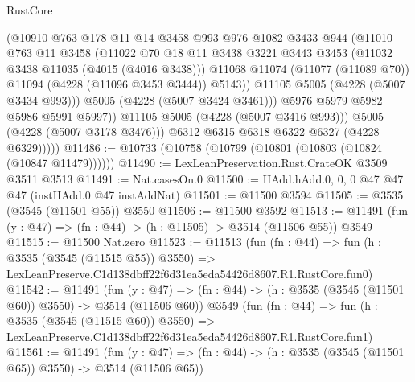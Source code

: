 \begin{lexlean}{RustCore}
\begin{coremodule}
                      (@10910
                        @763
                        @178
                        @11
                        @14
                        @3458
                        @993
                        @976
                        @1082
                        @3433
                        @944
                        (@11010
                          @763
                          @11
                          @3458
                          (@11022
                            @70
                            @18
                            @11
                            @3438
                            @3221
                            @3443
                            @3453
                            (@11032 @3438 @11035 (@4015 (@4016 @3438)))
                            @11068
                            @11074
                            (@11077 (@11089 @70))
                            @11094
                            (@4228 (@11096 @3453 @3444))
                            @5143))
                        @11105
                        @5005
                        (@4228 (@5007 @3434 @993)))
                      @5005
                      (@4228 (@5007 @3424 @3461)))
                    @5976
                    @5979
                    @5982
                    @5986
                    @5991
                    @5997))
                @11105
                @5005
                (@4228 (@5007 @3416 @993)))
              @5005
              (@4228 (@5007 @3178 @3476)))
            @6312
            @6315
            @6318
            @6322
            @6327
            (@4228 @6329)))))
@11486 := @10733 (@10758 (@10799 (@10801 (@10803 (@10824 (@10847 @11479))))))
@11490 := LexLeanPreservation.Rust.CrateOK @3509 @3511 @3513
@11491 := Nat.casesOn.{0}
@11500 := HAdd.hAdd.{0, 0, 0} @47 @47 @47 (instHAdd.{0} @47 instAddNat)
@11501 := @11500 @3594
@11505 := @3535 (@3545 (@11501 @55)) @3550
@11506 := @11500 @3592
@11513 := @11491 (fun (y : @47) => (fn : @44) -> (h : @11505) -> @3514 (@11506 @55)) @3549
@11515 := @11500 Nat.zero
@11523 := @11513
    (fun (fn : @44) =>
    fun (h : @3535 (@3545 (@11515 @55)) @3550) =>
    LexLeanPreserve.C1d138dbff22f6d31ea5eda54426d8607.R1.RustCore.fun0)
@11542 := @11491
    (fun (y : @47) => (fn : @44) -> (h : @3535 (@3545 (@11501 @60)) @3550) -> @3514 (@11506 @60))
    @3549
    (fun (fn : @44) =>
    fun (h : @3535 (@3545 (@11515 @60)) @3550) =>
    LexLeanPreserve.C1d138dbff22f6d31ea5eda54426d8607.R1.RustCore.fun1)
@11561 := @11491
    (fun (y : @47) => (fn : @44) -> (h : @3535 (@3545 (@11501 @65)) @3550) -> @3514 (@11506 @65))

\end{coremodule}
\end{lexlean}
